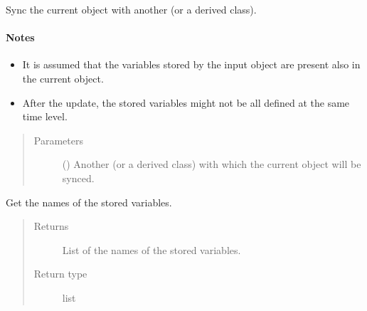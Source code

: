 \documentclass[letterpaper,10pt,english]{sphinxmanual}
\begin{document}
\begin{fulllineitems}
\begin{fulllineitems}
\end{fulllineitems}


\begin{fulllineitems}
\label{\detokenize{api:tasmania.storages.grid_data.GridData.update}}
Sync the current object with another {\hyperref[\detokenize{api:tasmania.storages.grid_data.GridData}]{}} (or a derived class).
\paragraph{Notes}
\begin{itemize}
\item {} 
It is assumed that  the variables stored by the input object are present also in the current object.

\item {} 
After the update, the stored variables might not be all defined at the same time level.

\end{itemize}
\begin{quote}\begin{description}
\item[{Parameters}] \leavevmode
{} () \textendash{} Another {\hyperref[\detokenize{api:tasmania.storages.grid_data.GridData}]{}} (or a derived class)
with which the current object will be synced.

\end{description}\end{quote}

\end{fulllineitems}


\begin{fulllineitems}
\label{\detokenize{api:tasmania.storages.grid_data.GridData.variable_names}}
Get the names of the stored variables.
\begin{quote}\begin{description}
\item[{Returns}] \leavevmode
List of the names of the stored variables.

\item[{Return type}] \leavevmode
list

\end{description}\end{quote}

\end{fulllineitems}


\end{fulllineitems}
\end{document}
